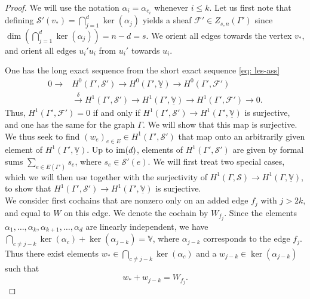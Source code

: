 \documentclass{article}
\theoremstyle{definition}
\theoremstyle{remark}
\newcommand{\im}{\textup{im}}
\begin{document}
\begin{proof}
 We will use the notation $\alpha_{i} = \alpha_{e_i}$ whenever $i\leq k$. Let us first note that defining $\mathcal{S}'(v_*) = \bigcap_{j=1}^{d}  \ker(\alpha_{j})$ yields a sheaf $\mathcal{F}' \in Z_{s, n}(\Gamma')$ since $\dim( \bigcap_{j=1}^{d} \ker(\alpha_{j})) = n - d = s$. We orient all edges towards the vertex $v_*$, and orient all edges $u_i'u_i$ from $u_i'$ towards $u_i$.

One has the long exact sequence from the short exact sequence \eqref{eq: les-ass}
\begin{equation*}
    \begin{array}{cl}
    0 \rightarrow & H^0(\Gamma', \mathcal{S}') \rightarrow H^0(\Gamma', \underline{\mathbb{V}}) \rightarrow H^0(\Gamma', \mathcal{F}') \\[10pt]
    &\xrightarrow{\delta} H^1(\Gamma', \mathcal{S}') \rightarrow H^1(\Gamma', \underline{\mathbb{V}}) \rightarrow H^1(\Gamma', \mathcal{F}') \rightarrow 0.
\end{array}
\end{equation*}
Thus, $H^{1}(\Gamma', \mathcal{F}') = 0$ if and only if $H^1(\Gamma', \mathcal{S}') \rightarrow H^1(\Gamma', \underline{\mathbb{V}})$ is surjective, and one has the same for the graph $\Gamma$. We will show that this map is surjective. We thus seek to find $ (w_{e})_{e \in E} \in H^1(\Gamma', \mathcal{S}')$ that map onto an arbitrarily given element of $H^{1}( \Gamma', \underline{\mathbb{V}})$. Up to $\im(d)$, elements of $H^{1}( \Gamma', \mathcal{S}')$ are given by formal sums $\sum_{e\in E(\Gamma')} s_e$, where $s_e\in \mathcal{S}'(e)$.
We will first treat two special cases, which we will then use together with the surjectivity of $H^{1}(\Gamma, \mathcal{S}) \rightarrow H^{1}(\Gamma, \underline{\mathbb{V}})$, to show that $H^{1}(\Gamma', \mathcal{S}') \rightarrow H^{1}(\Gamma', \underline{\mathbb{V}})$ is surjective.\\
We consider first cochains that are nonzero only on an added edge $f_{j}$ with $j > 2k$, and equal to $W$ on this edge. We denote the cochain by $W_{f_{j}}$. Since the elements $\alpha_{1}, \dots, \alpha_{k}, \alpha_{k+1} , \dots, \alpha_{d}$ are linearly independent, we have $\bigcap_{c \neq j-k} \ker(\alpha_c) + \ker(\alpha_{j-k}) = \mathbb{V}$, where $\alpha_{j-k}$ corresponds to the edge $f_j$. Thus there exist elements $w_{*} \in \bigcap_{c \neq j-k} \ker(\alpha_c)$ and a $w_{j-k} \in \ker(\alpha_{j-k})$ such that 
\begin{equation*}
    w_{*}  + w_{j-k} = W_{f_j}. 

\end{equation*}
\end{proof}
\end{document}
